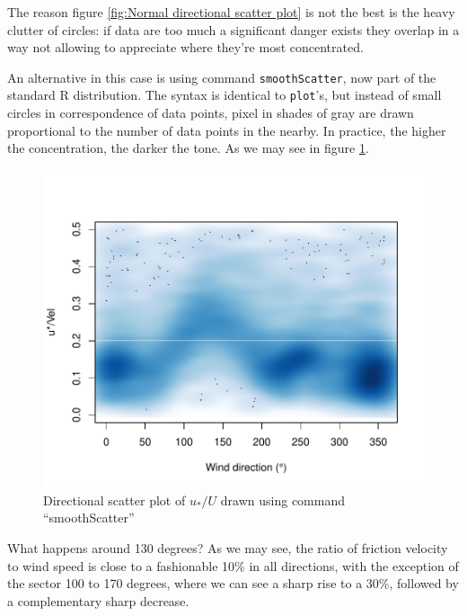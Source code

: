 \documentclass[a4paper,10pt]{book}
\begin{document}
The reason figure \ref{fig:Normal directional scatter plot} is not the best is the heavy clutter of circles: if data are too much a significant danger exists they overlap in a way not allowing to appreciate where they're most concentrated.

An alternative in this case is using command \verb|smoothScatter|, now part of the standard R distribution. The syntax is identical to \verb|plot|'s, but instead of small circles in correspondence of data points, pixel in shades of gray are drawn proportional to the number of data points in the nearby. In practice, the higher the concentration, the darker the tone. As we may see in figure \ref{fig:Improved directional scatter plot}.

\begin{figure}[htp]
 \centering
 \begin{center}
 \includegraphics[scale=1,keepaspectratio=true]{./diagrams/UstarOverVel_vs_Dir.pdf}
 \end{center}
 \caption{Directional scatter plot of $u_{*}/U$ drawn using command ``smoothScatter''}
 \label{fig:Improved directional scatter plot}
\end{figure}

What happens around 130 degrees? As we may see, the ratio of friction velocity to wind speed is close to a fashionable 10\% in all directions, with the exception of the sector 100 to 170 degrees, where we can see a sharp rise to a 30\%, followed by a complementary sharp decrease.
\end{document}

